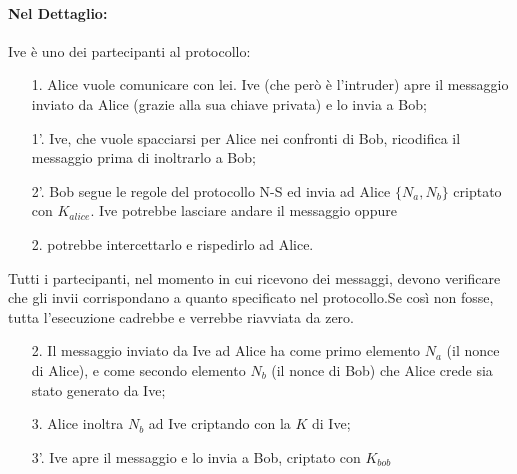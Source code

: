 \paragraph{Nel Dettaglio: }
Ive è uno dei partecipanti al protocollo:

\begin{enumerate}
    \item[1.]  Alice vuole comunicare con lei. Ive (che però è l'intruder)
        apre il messaggio inviato da Alice
        (grazie alla sua chiave privata) e lo invia a Bob;
    \item[1'.] Ive, che vuole spacciarsi per Alice nei confronti di Bob,
        ricodifica il messaggio prima di inoltrarlo
        a Bob;
    \item[2'.] Bob segue le regole del protocollo N-S ed invia ad Alice
        \(\{N_a, N_b\}\) criptato con \(K_{alice}\). Ive
        potrebbe lasciare andare il messaggio oppure
    \item[2.] potrebbe intercettarlo e rispedirlo ad Alice.
\end{enumerate}
Tutti i partecipanti, nel momento in cui ricevono dei messaggi, devono
verificare che gli invii
corrispondano a quanto specificato nel protocollo.Se così non fosse, tutta
l'esecuzione cadrebbe e
verrebbe riavviata da zero.

\begin{enumerate}
    \item[2.] Il messaggio inviato da Ive ad Alice ha come primo
        elemento \(N_a\) (il nonce di Alice), e come secondo elemento \(N_b\)
        (il nonce di Bob) che Alice crede sia stato
        generato da Ive;
    \item[3.] Alice inoltra \(N_b\) ad Ive criptando con la \(K\) di Ive;
    \item[3'.] Ive apre il messaggio e lo invia a Bob, criptato con \(K_{bob}\)
\end{enumerate}

